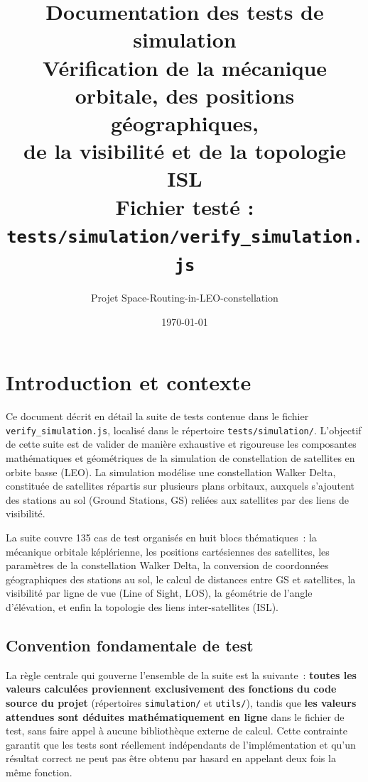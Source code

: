\documentclass[12pt,a4paper]{article}
\title{
    \textbf{Documentation des tests de simulation}\\[0.4em]
    \large Vérification de la mécanique orbitale, des positions géographiques,\\
    de la visibilité et de la topologie ISL\\[0.4em]
    \normalsize Fichier testé : \texttt{tests/simulation/verify\_simulation.js}
}
\author{Projet Space-Routing-in-LEO-constellation}
\date{\today}
\begin{document}
\maketitle
\tableofcontents
\newpage

\section{Introduction et contexte}

Ce document décrit en détail la suite de tests contenue dans le fichier \texttt{verify\_simulation.js}, localisé dans le répertoire \texttt{tests/simulation/}. L'objectif de cette suite est de valider de manière exhaustive et rigoureuse les composantes mathématiques et géométriques de la simulation de constellation de satellites en orbite basse (LEO). La simulation modélise une constellation Walker Delta, constituée de satellites répartis sur plusieurs plans orbitaux, auxquels s'ajoutent des stations au sol (Ground Stations, GS) reliées aux satellites par des liens de visibilité.

La suite couvre 135 cas de test organisés en huit blocs thématiques~: la mécanique orbitale képlérienne, les positions cartésiennes des satellites, les paramètres de la constellation Walker Delta, la conversion de coordonnées géographiques des stations au sol, le calcul de distances entre GS et satellites, la visibilité par ligne de vue (Line of Sight, LOS), la géométrie de l'angle d'élévation, et enfin la topologie des liens inter-satellites (ISL).

\subsection{Convention fondamentale de test}

La règle centrale qui gouverne l'ensemble de la suite est la suivante~: \textbf{toutes les valeurs calculées proviennent exclusivement des fonctions du code source du projet} (répertoires \texttt{simulation/} et \texttt{utils/}), tandis que \textbf{les valeurs attendues sont déduites mathématiquement en ligne} dans le fichier de test, sans faire appel à aucune bibliothèque externe de calcul. Cette contrainte garantit que les tests sont réellement indépendants de l'implémentation et qu'un résultat correct ne peut pas être obtenu par hasard en appelant deux fois la même fonction.
\end{document}
